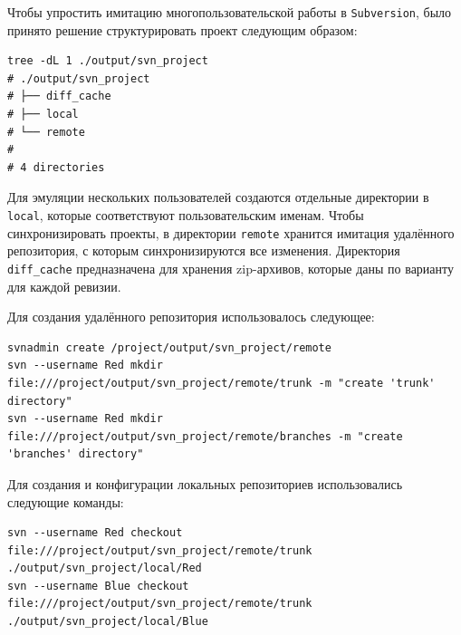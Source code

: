Чтобы упростить имитацию многопользовательской работы в \texttt{Subversion}, было принято решение структурировать проект следующим образом: 
\begin{lstlisting}
tree -dL 1 ./output/svn_project
# ./output/svn_project
# ├── diff_cache
# ├── local
# └── remote
# 
# 4 directories
\end{lstlisting}

Для эмуляции нескольких пользователей создаются отдельные директории в \texttt{local}, которые соответствуют пользовательским именам. Чтобы синхронизировать проекты, в директории \texttt{remote} хранится имитация удалённого репозитория, с которым синхронизируются все изменения. Директория \texttt{diff\_cache} предназначена для хранения zip-архивов, которые даны по варианту для каждой ревизии.

Для создания удалённого репозитория использовалось следующее:
\begin{lstlisting}
svnadmin create /project/output/svn_project/remote
svn --username Red mkdir file:///project/output/svn_project/remote/trunk -m "create 'trunk' directory"
svn --username Red mkdir file:///project/output/svn_project/remote/branches -m "create 'branches' directory"
\end{lstlisting}

Для создания и конфигурации локальных репозиториев использовались следующие команды:
\begin{lstlisting}
svn --username Red checkout file:///project/output/svn_project/remote/trunk ./output/svn_project/local/Red
svn --username Blue checkout file:///project/output/svn_project/remote/trunk ./output/svn_project/local/Blue
\end{lstlisting}